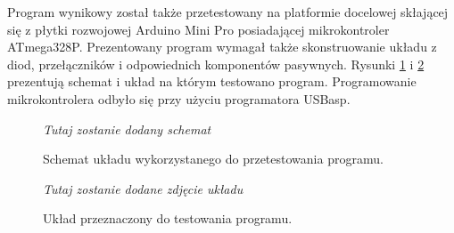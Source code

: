 Program wynikowy został także przetestowany na platformie docelowej skłającej się z płytki rozwojowej Arduino Mini Pro posiadającej mikrokontroler ATmega328P. Prezentowany program wymagał także skonstruowanie układu z diod, przełączników i odpowiednich komponentów pasywnych. Rysunki \ref{fig:schematic} i \ref{fig:electronics} prezentują schemat i układ na którym testowano program. Programowanie mikrokontrolera odbyło się przy użyciu programatora USBasp.

\begin{figure}
	\textit{Tutaj zostanie dodany schemat}
	\caption{Schemat układu wykorzystanego do przetestowania programu.}
	\label{fig:schematic}
\end{figure}

\begin{figure}
	\textit{Tutaj zostanie dodane zdjęcie układu}
	\caption{Układ przeznaczony do testowania programu.}
	\label{fig:electronics}
\end{figure}


